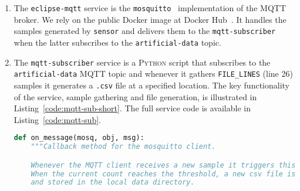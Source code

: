 \begin{enumerate}
\begin{lstlisting}[language=Python,caption={Snippet illustrating the artificial data generation in the \texttt{sensor} service.},label=code:sensor-data-gen]
    Parameters
    ----------
    sample_rate : float
        How many samples are generated per second
    """
    killer = Killer()
    global CL_ID
    past_ts = time.time()
    while 1:
        value = ""
        # First we generate <sample_rate> timestamps in one second
        tstamps = [i for i in random.uniform(low=time.time(),
                                             high=time.time() + 1,
                                             size=(sample_rate))]
        tstamps.sort()
        # Second we compute the intervals between them
        for i in tstamps:
            tmp = datetime.fromtimestamp(i).strftime('%Y-%m-%d %H:%M:%S')
            value += tmp+','+str(int((i - past_ts) * 1e6))+'\n'
            past_ts = i
        publish.single("artificial-data-{}".format(CL_ID), value)
        time.sleep(1)
        if killer.kill_now:
            print("Exiting gracefully!")
            break
\end{lstlisting}
    \item The \texttt{eclipse-mqtt} service is the \texttt{mosquitto}~\cite{mqtt-eclipse} implementation of the \textsc{MQTT} broker. We rely on the public Docker image at Docker Hub~\cite{mqtt-image}. It handles the samples generated by \texttt{sensor} and delivers them to the \texttt{mqtt-subscriber} when the latter subscribes to the \texttt{artificial-data} topic.
    \item The \texttt{mqtt-subscriber} service is a \textsc{Python} script that subscribes to the \texttt{artificial-data} \textsc{MQTT} topic and whenever it gathers \texttt{FILE\_LINES} (line 26) samples it generates a \texttt{.csv} file at a specified location. The key functionality of the service, sample gathering and file generation, is illustrated in Listing~\ref{code:mqtt-sub-short}. The full service code is available in Listing~\ref{code:mqtt-sub}.
\begin{lstlisting}[language=Python,caption={Snippet illustrating the data gathering and file generation in the \texttt{mqtt-subscriber} service.},label=code:mqtt-sub-short]
def on_message(mosq, obj, msg):
    """Callback method for the mosquitto client.

    Whenever the MQTT client receives a new sample it triggers this method.
    When the current count reaches the threshold, a new csv file is generated
    and stored in the local data directory.


\end{lstlisting}
\end{enumerate}
